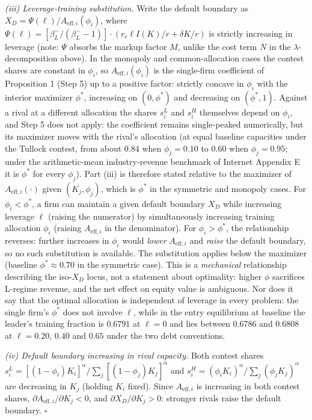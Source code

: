 \documentclass[
  11pt,
  letterpaper,
]{scrartcl}
\begin{document}
\emph{(iii) Leverage-training substitution.} Write the default boundary
as \(X_D = \Psi(\ell) / A_{\text{eff},i}(\phi_i)\), where
\(\Psi(\ell) = [\beta_L^- / (\beta_L^- - 1)] \cdot (r_c \ell I(K) / r + \delta K/r)\)
is strictly increasing in leverage (note: \(\Psi\) absorbs the markup
factor \(M\), unlike the cost term \(N\) in the
\(\lambda\)-decomposition above). In the monopoly and common-allocation
cases the contest shares are constant in \(\phi_i\), so
\(A_{\text{eff},i}(\phi_i)\) is the single-firm coefficient of
Proposition 1 (Step 5) up to a positive factor: strictly concave in
\(\phi_i\) with the interior maximizer \(\phi^*\), increasing on
\((0, \phi^*)\) and decreasing on \((\phi^*, 1)\). Against a rival at a
different allocation the shares \(s_i^L\) and \(s_i^H\) themselves
depend on \(\phi_i\), and Step 5 does not apply: the coefficient remains
single-peaked numerically, but its maximizer moves with the rival's
allocation (at equal baseline capacities under the Tullock contest, from
about \(0.84\) when \(\phi_j = 0.10\) to \(0.60\) when
\(\phi_j = 0.95\); under the arithmetic-mean industry-revenue benchmark
of Internet Appendix E it is \(\phi^*\) for every \(\phi_j\)). Part
(iii) is therefore stated relative to the maximizer of
\(A_{\text{eff},i}(\cdot)\) given \((K_j, \phi_j)\), which is \(\phi^*\)
in the symmetric and monopoly cases. For \(\phi_i < \phi^*\), a firm can
maintain a given default boundary \(X_D\) while increasing leverage
\(\ell\) (raising the numerator) by simultaneously increasing training
allocation \(\phi_i\) (raising \(A_{\text{eff},i}\) in the denominator).
For \(\phi_i > \phi^*\), the relationship reverses: further increases in
\(\phi_i\) would \emph{lower} \(A_{\text{eff},i}\) and \emph{raise} the
default boundary, so no such substitution is available. The substitution
applies below the maximizer (baseline \(\phi^* \approx 0.70\) in the
symmetric case). This is a \emph{mechanical} relationship describing the
iso-\(X_D\) locus, not a statement about optimality: higher \(\phi\)
sacrifices L-regime revenue, and the net effect on equity value is
ambiguous. Nor does it say that the optimal allocation is independent of
leverage in every problem: the single firm's \(\phi^*\) does not involve
\(\ell\), while in the entry equilibrium at baseline the leader's
training fraction is \(0.6791\) at \(\ell = 0\) and lies between
\(0.6786\) and \(0.6808\) at \(\ell = 0.20\), \(0.40\) and \(0.65\)
under the two debt conventions.

\emph{(iv) Default boundary increasing in rival capacity.} Both contest
shares
\(s_i^L = [(1-\phi_i)K_i]^\alpha / \sum_j [(1-\phi_j)K_j]^\alpha\) and
\(s_i^H = (\phi_i K_i)^\alpha / \sum_j (\phi_j K_j)^\alpha\) are
decreasing in \(K_j\) (holding \(K_i\) fixed). Since
\(A_{\text{eff},i}\) is increasing in both contest shares,
\(\partial A_{\text{eff},i} / \partial K_j < 0\), and
\(\partial X_D / \partial K_j > 0\): stronger rivals raise the default
boundary. \(\square\)
\end{document}
